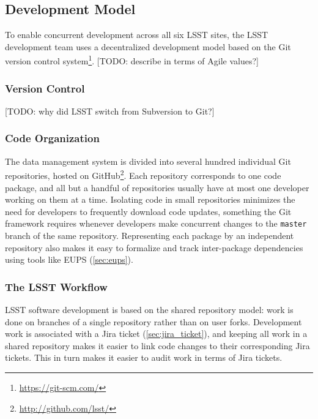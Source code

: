 \subsection{Development Model}\label{sec:development}

To enable concurrent development across all six LSST sites, the LSST development team uses a decentralized development model based on the Git version control system\footnote{\url{https://git-scm.com/}}.
[TODO: describe in terms of Agile values?]

\subsubsection{Version Control}\label{sec:git}\label{sec:subversion}

[TODO: why did LSST switch from Subversion to Git?]

\subsubsection{Code Organization}\label{sec:git_repositories}

The data management system is divided into several hundred individual Git repositories, hosted on GitHub\footnote{\url{http://github.com/lsst/}}.
Each repository corresponds to one code package, and all but a handful of repositories usually have at most one developer working on them at a time.
Isolating code in small repositories minimizes the need for developers to frequently download code updates, something the Git framework requires whenever developers make concurrent changes to the \texttt{master} branch of the same repository.
Representing each package by an independent repository also makes it easy to formalize and track inter-package dependencies using tools like EUPS (\autoref{sec:eups}).

\subsubsection{The LSST Workflow}\label{sec:dev_workflow}

LSST software development is based on the shared repository model: work is done on branches of a single repository rather than on user forks.
Development work is associated with a Jira ticket (\autoref{sec:jira_ticket}), and keeping all work in a shared repository makes it easier to link code changes to their corresponding Jira tickets.
This in turn makes it easier to audit work in terms of Jira tickets.

